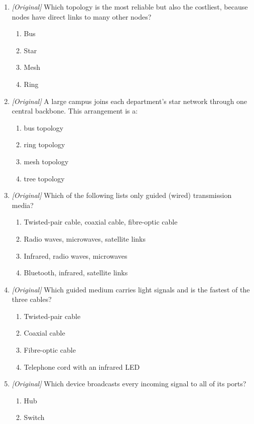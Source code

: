 \begin{enumerate}[label=\textbf{Q\arabic*.}, leftmargin=*]
\item \textit{[Original]} Which topology is the most reliable but also the
  costliest, because nodes have direct links to many other nodes?
  \begin{enumerate}[label=\Alph*.]
    \item Bus
    \item Star
    \item Mesh
    \item Ring
  \end{enumerate}
\item \textit{[Original]} A large campus joins each department's star network
  through one central backbone. This arrangement is a:
  \begin{enumerate}[label=\Alph*.]
    \item bus topology
    \item ring topology
    \item mesh topology
    \item tree topology
  \end{enumerate}
\item \textit{[Original]} Which of the following lists only guided
  (wired) transmission media?
  \begin{enumerate}[label=\Alph*.]
    \item Twisted-pair cable, coaxial cable, fibre-optic cable
    \item Radio waves, microwaves, satellite links
    \item Infrared, radio waves, microwaves
    \item Bluetooth, infrared, satellite links
  \end{enumerate}
\item \textit{[Original]} Which guided medium carries light signals and is the
  fastest of the three cables?
  \begin{enumerate}[label=\Alph*.]
    \item Twisted-pair cable
    \item Coaxial cable
    \item Fibre-optic cable
    \item Telephone cord with an infrared LED
  \end{enumerate}
\item \textit{[Original]} Which device broadcasts every incoming signal to
  all of its ports?
  \begin{enumerate}[label=\Alph*.]
    \item Hub
    \item Switch

\end{enumerate}
\end{enumerate}
